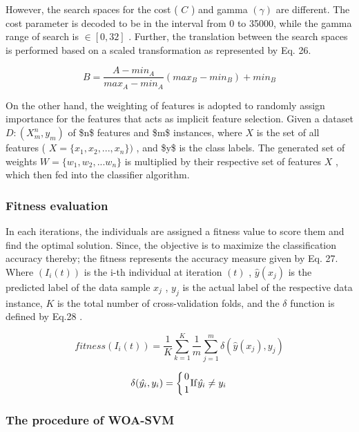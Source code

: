 However, the search spaces for the cost ( $C$ ) and gamma $(\gamma)$ are different. The cost parameter is decoded to be in the interval from 0 to 35000, while the gamma range of search is $\in[0,32]$ . Further, the translation between the search spaces is performed based on a scaled transformation as represented by Eq. 26.

\begin{equation}
B=\frac{A-m i n_{A}}{m a x_{A}-m i n_{A}}(m a x_{B}-m i n_{B})+m i n_{B}
\end{equation}

On the other hand, the weighting of features is adopted to randomly assign importance for the features that acts as implicit feature selection. Given a dataset $D:(X_{m}^{n},y_{m})$ of \$n\$ features and \$m\$ instances, where $X$ is the set of all features ( $X=\{x_{1},x_{2},...,x_{n}\})$ , and \$y\$ is the class labels. The generated set of weights $W=\{w_{1},w_{2},...w_{n}\}$ is multiplied by their respective set of features $X$ , which then fed into the classifier algorithm.

\subsubsection{Fitness evaluation}

In each iterations, the individuals are assigned a fitness value to score them and find the optimal solution. Since, the objective is to maximize the classification accuracy thereby; the fitness represents the accuracy measure given by Eq. 27. Where $\left(I_{i}(t)\right)$ is the i-th individual at iteration $(t)$ , ${\hat{y}}(x_{j})$ is the predicted label of the data sample $x_{j}$ , $y_{j}$ is the actual label of the respective data instance, $K$ is the total number of cross-validation folds, and the $\delta$ function is defined by Eq.28 .

\begin{equation}
f i t n e s s(I_{i}(t))=\frac{1}{K}\sum_{k=1}^{K}\frac{1}{m}\sum_{j=1}^{m}\delta(\hat{y}(x_{j}),y_{j})
\end{equation}

\begin{equation}
\delta(\hat{y_{i}},y_{i})=\left\{{0\atop1}\mathrm{If}\hat{y_{i}}\neq y_{i}\right.
\end{equation}

\subsubsection{The procedure of WOA-SVM}

